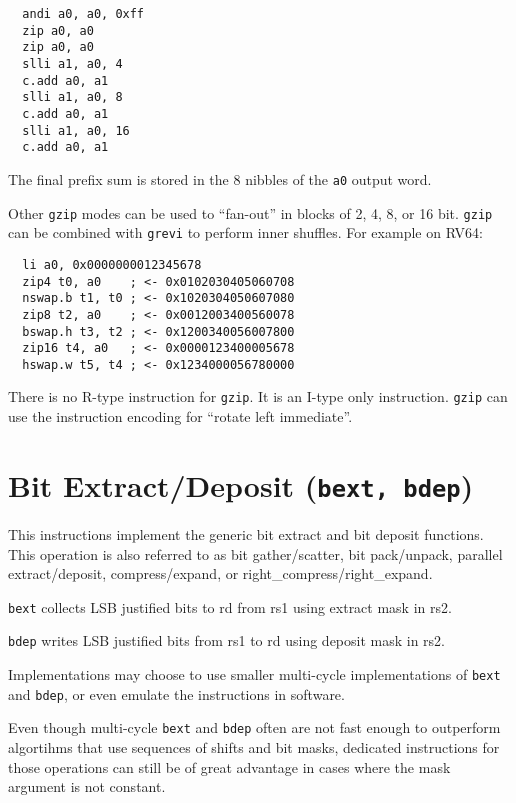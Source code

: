 \begin{verbatim}
  andi a0, a0, 0xff
  zip a0, a0
  zip a0, a0
  slli a1, a0, 4
  c.add a0, a1
  slli a1, a0, 8
  c.add a0, a1
  slli a1, a0, 16
  c.add a0, a1
\end{verbatim}

The final prefix sum is stored in the 8 nibbles of the {\tt a0} output word.

Other {\tt gzip} modes can be used to ``fan-out'' in blocks of 2, 4, 8, or 16 bit.
{\tt gzip} can be combined with {\tt grevi} to perform inner shuffles. For example
on RV64:

\begin{verbatim}
  li a0, 0x0000000012345678
  zip4 t0, a0    ; <- 0x0102030405060708
  nswap.b t1, t0 ; <- 0x1020304050607080
  zip8 t2, a0    ; <- 0x0012003400560078
  bswap.h t3, t2 ; <- 0x1200340056007800
  zip16 t4, a0   ; <- 0x0000123400005678
  hswap.w t5, t4 ; <- 0x1234000056780000
\end{verbatim}



There is no R-type instruction for {\tt gzip}. It is an I-type only instruction.
\texttt{gzip} can use the instruction encoding for ``rotate left immediate''.


\section{Bit Extract/Deposit (\texttt{bext,\ bdep})}

This instructions implement the generic bit extract and bit deposit functions.
This operation is also referred to as bit gather/scatter, bit pack/unpack,
parallel extract/deposit, compress/expand, or right\_compress/right\_expand.

\texttt{bext} collects LSB justified bits to rd from rs1 using extract mask in rs2.

\texttt{bdep} writes LSB justified bits from rs1 to rd using deposit mask in rs2.



Implementations may choose to use smaller multi-cycle implementations of
\texttt{bext} and \texttt{bdep}, or even emulate the instructions in software.

Even though multi-cycle \texttt{bext} and \texttt{bdep} often are not fast
enough to outperform algortihms that use sequences of shifts and bit masks,
dedicated instructions for those operations can still be of great advantage in
cases where the mask argument is not constant.

